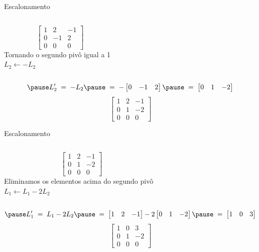 \begin{resolution}{Escalonamento}
  \begin{columns}
    \[\;\;\;
      \begin{bmatrix}
        1 & 2  & -1 \\
        0 & -1 & 2  \\
        0 & 0  & 0
      \end{bmatrix}
    \]
    \pause
    Tornando o segundo pivô igual a 1
    \\ \pause
    \(
      L_2 \leftarrow - L_2
    \)
  \end{columns}
  \vspace{-\baselineskip}
  \[
    \pause
    L'_2
    \;=\;
    - L_2
    \pause
    \;=\;
    -
    \begin{bmatrix}
      0 & -1 & 2
    \end{bmatrix}
    \pause
    \;=\;
    \begin{bmatrix}
      0 & 1 & -2
    \end{bmatrix}
  \]
  \pause
  \[
    \begin{bmatrix}
      1 & 2 & -1 \\
      0 & 1 & -2 \\
      0 & 0 & 0
    \end{bmatrix}
  \]
\end{resolution}

\begin{resolution}{Escalonamento}
  \begin{columns}
    \[\;\;\;
      \begin{bmatrix}
        1 & 2 & -1 \\
        0 & 1 & -2 \\
        0 & 0 & 0
      \end{bmatrix}
    \]
    \pause
    Eliminamos os elementos acima do segundo pivô
    \\ \pause
    \(
      L_1 \leftarrow L_1 - 2 L_2
    \)
  \end{columns}
  \vspace{-\baselineskip}
  \[
    \pause
    L'_1
    \;=\;
    L_1 - 2 L_2
    \pause
    \;=\;
    \begin{bmatrix}
      1 & 2 & -1
    \end{bmatrix}
    - 2
    \begin{bmatrix}
      0 & 1 & -2
    \end{bmatrix}
    \pause
    \;=\;
    \begin{bmatrix}
      1 & 0 & 3
    \end{bmatrix}
  \]
  \pause
  \[
    \begin{bmatrix}
      1 & 0 & 3  \\
      0 & 1 & -2 \\
      0 & 0 & 0
    \end{bmatrix}
  \]
\end{resolution}

